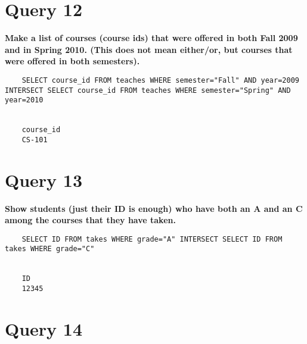 \documentclass[letterpaper]{article}
\begin{document}
\section{Query 12}

    \textbf{Make a list of courses (course ids) that were offered in both Fall 2009 and in Spring 2010.   (This does not mean either/or, but courses that were offered in both semesters).}
    \begin{lstlisting}
    SELECT course_id FROM teaches WHERE semester="Fall" AND year=2009 INTERSECT SELECT course_id FROM teaches WHERE semester="Spring" AND year=2010
       
       
    course_id
    CS-101
    \end{lstlisting}
        
\section{Query 13}

    \textbf{Show students (just their ID is enough) who have both an A and an C among the courses that they have taken.}
    \begin{lstlisting}
    SELECT ID FROM takes WHERE grade="A" INTERSECT SELECT ID FROM takes WHERE grade="C"


    ID
    12345
    \end{lstlisting}
        
\section{Query 14}
\end{document}

